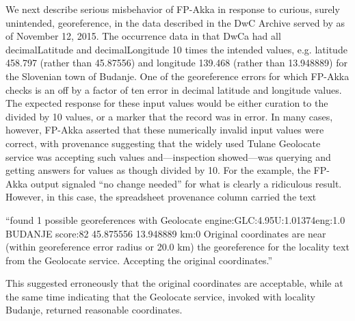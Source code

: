 \documentclass{article}
\begin{document}
We next describe serious misbehavior of FP-Akka in response to curious, surely unintended, georeference, in the data described in 
the DwC Archive served by \citep{SpiderDiversityCorrigendum2015} as of November 12, 2015. 
The occurrence data in that DwCa had all decimalLatitude and decimalLongitude 10 times the intended values, e.g. latitude 458.797 (rather than 45.87556) and longitude 139.468 (rather than 13.948889) for the Slovenian town of Budanje.  One of the georeference errors for which FP-Akka checks is an off by a factor of ten error in decimal latitude and longitude values.  The expected response for these input values would be either curation to the divided by 10 values, or a marker that the record was in error.  In many cases, however, FP-Akka asserted that these numerically invalid input values were correct, with provenance suggesting that the widely used Tulane Geolocate service was accepting such values and---inspection showed---was querying and getting answers for values as though divided by 10.  For the example, the FP-Akka output signaled ``no change needed'' for what is clearly a ridiculous result. However, in this case, the spreadsheet provenance column carried the text 

``\sffamily found 1 possible georeferences with Geolocate engine:GLC:4.95\textbar U:1.01374\textbar eng:1.0 \textbar BUDANJE score:82 45.875556 13.948889 km:0 \textbar Original coordinates are near (within georeference error radius or 20.0 km) the georeference for the locality text from the Geolocate service.  Accepting the original coordinates.\rmfamily'' 

This suggested erroneously that the original coordinates are acceptable, while at the same time indicating that the Geolocate service, invoked with locality Budanje, returned reasonable coordinates. 
\end{document}
